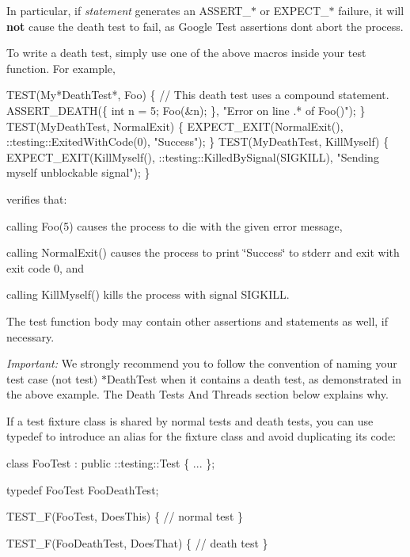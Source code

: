 In particular, if {\itshape statement} generates an {\ttfamily A\+S\+S\+E\+R\+T\+\_\+$\ast$} or {\ttfamily E\+X\+P\+E\+C\+T\+\_\+$\ast$} failure, it will {\bfseries not} cause the death test to fail, as Google Test assertions don\textquotesingle{}t abort the process.

To write a death test, simply use one of the above macros inside your test function. For example,


\begin{DoxyCode}
TEST(My*DeathTest*, Foo) \{
  // This death test uses a compound statement.
  ASSERT\_DEATH(\{ int n = 5; Foo(&n); \}, "Error on line .* of Foo()");
\}
TEST(MyDeathTest, NormalExit) \{
  EXPECT\_EXIT(NormalExit(), ::testing::ExitedWithCode(0), "Success");
\}
TEST(MyDeathTest, KillMyself) \{
  EXPECT\_EXIT(KillMyself(), ::testing::KilledBySignal(SIGKILL), "Sending myself unblockable signal");
\}
\end{DoxyCode}


verifies that\+:


\begin{DoxyItemize}
\item calling {\ttfamily Foo(5)} causes the process to die with the given error message,
\item calling {\ttfamily Normal\+Exit()} causes the process to print {\ttfamily \char`\"{}\+Success\char`\"{}} to stderr and exit with exit code 0, and
\item calling {\ttfamily Kill\+Myself()} kills the process with signal {\ttfamily S\+I\+G\+K\+I\+LL}.
\end{DoxyItemize}

The test function body may contain other assertions and statements as well, if necessary.

{\itshape Important\+:} We strongly recommend you to follow the convention of naming your test case (not test) {\ttfamily $\ast$\+Death\+Test} when it contains a death test, as demonstrated in the above example. The {\ttfamily Death Tests And Threads} section below explains why.

If a test fixture class is shared by normal tests and death tests, you can use typedef to introduce an alias for the fixture class and avoid duplicating its code\+: 
\begin{DoxyCode}
class FooTest : public ::testing::Test \{ ... \};

typedef FooTest FooDeathTest;

TEST\_F(FooTest, DoesThis) \{
  // normal test
\}

TEST\_F(FooDeathTest, DoesThat) \{
  // death test
\}
\end{DoxyCode}



